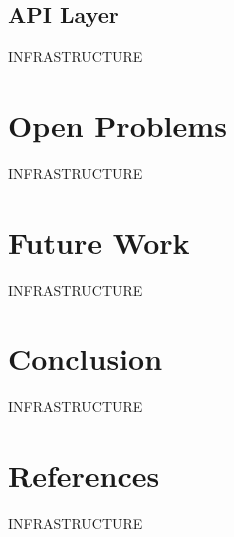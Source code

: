 \documentclass{beamer}
\begin{document}
\subsection{API Layer}
\begin{frame}
  INFRASTRUCTURE
\end{frame}

\section{Open Problems}
\begin{frame}
  INFRASTRUCTURE
\end{frame}

\section{Future Work}
\begin{frame}
  INFRASTRUCTURE
\end{frame}

\section{Conclusion}
\begin{frame}
  INFRASTRUCTURE
\end{frame}

\section{References}
\begin{frame}
  INFRASTRUCTURE
\end{frame}
\end{document}
